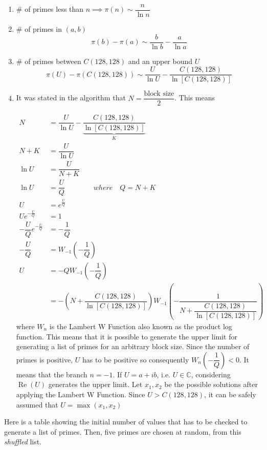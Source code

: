 \begin{enumerate}
    \item $\#$ of primes less than $n\implies\pi(n)\sim\dfrac{n}{\ln n}$
    \item $\#$ of primes in $(a,b)$$$\pi(b)-\pi(a)\sim\dfrac{b}{\ln b}-\dfrac{a}{\ln a}$$
    \item $\#$ of primes between $C(128,128)$ and an upper bound $U$ $$\pi(U)-\pi(C(128,128))\sim\dfrac{U}{\ln U}-\dfrac{C(128,128)}{\ln [C(128,128)]}$$
    \item It was stated in the algorithm that $N=\dfrac{\text{block size}}2$. This means
    
    \begin{align*}
        N&=\dfrac{U}{\ln U}-\underbrace{\dfrac{C(128,128)}{\ln [C(128,128)]}}_K\\N+K&=\dfrac{U}{\ln U}\\\ln U&=\dfrac{U}{N+K}\\
        \ln U&=\dfrac{U}{Q}\qquad\qquad where\quad Q=N+K\\
        U&=e^{\frac{U}{Q}}\\Ue^{-\frac{U}{Q}}&=1\\-\dfrac{U}{Q}e^{-\frac{U}{Q}}&=-\dfrac{1}{Q}\\-\dfrac{U}{Q}&=W_{-1}\left(-\dfrac{1}{Q}\right)\\
        U&=-QW_{-1}\left(-\dfrac{1}{Q}\right)\\&=-\left(N+\dfrac{C(128,128)}{\ln[C(128,128)]}\right)W_{-1}\left(-\dfrac{1}{N+\dfrac{C(128,128)}{\ln[C(128,128)]}}\right)
    \end{align*}
    where $W_n$ is the Lambert W Function\cite{corless1996lambertw,weisstein2002lambert} also known as the product log function. This means that it is possible to generate the upper limit for generating a list of primes for an arbitrary block size. Since the number of primes is positive, $U$ has to be positive so consequently $W_n\left(-\dfrac{1}{Q}\right)<0$. It means that the branch $n=-1$. If $U=a+ib$, i.e. $U\in\mathbb{C}$, considering $\operatorname{Re}(U)$ generates the upper limit. Let $x_1,x_2$ be the possible solutions after applying the Lambert W Function. Since $U>C(128,128)$, it can be safely assumed that $U=\max(x_1,x_2)$
\end{enumerate}
\FloatBarrier
\begin{flushleft}
Here is a table showing the initial number of values that has to be checked to generate a list of primes. Then, five primes are chosen at random, from this \textit{shuffled} list.
\end{flushleft}
